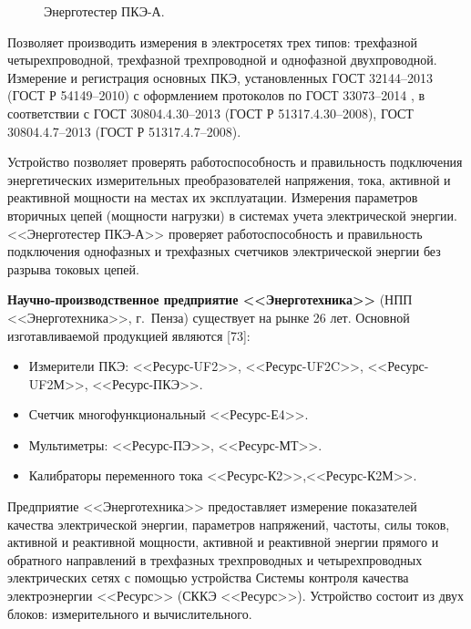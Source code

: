 \begin{figure}[ht]
	\caption{Энерготестер ПКЭ-А.}\label{fig:picture10}
\end{figure}

Позволяет производить измерения в электросетях трех типов: трехфазной четырехпроводной, трехфазной трехпроводной и однофазной двухпроводной. Измерение и регистрация основных ПКЭ, установленных ГОСТ 32144--2013 \cite{GOST32144-2013} (ГОСТ Р 54149--2010) с оформлением протоколов по ГОСТ 33073--2014 \cite{GOST33073-2014}, в соответствии с ГОСТ 30804.4.30--2013 \cite{GOST30804.4.30-2013} (ГОСТ Р 51317.4.30--2008), ГОСТ 30804.4.7--2013 \cite{GOST30804.4.7-2013} (ГОСТ Р 51317.4.7--2008). 

Устройство позволяет проверять работоспособность и правильность подключения энергетических измерительных преобразователей напряжения, тока, активной и реактивной мощности на местах их эксплуатации. Измерения параметров вторичных цепей (мощности нагрузки) в системах учета электрической энергии. <<Энерготестер ПКЭ-А>>  проверяет работоспособность и правильность подключения однофазных и трехфазных счетчиков электрической энергии без разрыва токовых цепей.

\textbf{Научно-производственное предприятие <<Энерготехника>>}  (НПП <<Энерготехника>>, г.~Пенза) существует на рынке 26 лет. Основной изготавливаемой продукцией являются [73]: 

\begin{itemize}
	\item Измерители ПКЭ: <<Ресурс-UF2>>, <<Ресурс-UF2C>>, <<Ресурс-UF2М>>, <<Ресурс-ПКЭ>>.
	\item Счетчик многофункциональный <<Ресурс-Е4>>.
	\item Мультиметры: <<Ресурс-ПЭ>>, <<Ресурс-МТ>>.
	\item Калибраторы переменного тока <<Ресурс-К2>>,<<Ресурс-К2М>>.
\end{itemize}

Предприятие <<Энерготехника>> предоставляет измерение показателей качества электрической энергии, параметров напряжений, частоты, силы токов, активной и реактивной мощности, активной и реактивной энергии прямого и обратного направлений в трехфазных трехпроводных и четырехпроводных электрических сетях с помощью устройства Системы контроля качества электроэнергии <<Ресурс>> (СККЭ <<Ресурс>>). Устройство состоит из двух блоков: измерительного и  вычислительного.

